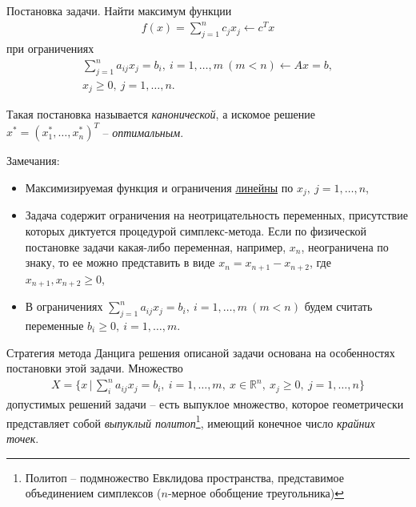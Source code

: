 \documentclass[%
	11pt,
	a4paper,
	utf8,
		]{article}
\begin{document}

Постановка задачи. Найти максимум функции
\begin{align*}
f(x) = \sum_{j=1}^{n} c_j x_j \leftarrow c^T x
\end{align*}
при ограничениях
\begin{align*}
	\sum_{j=1}^{n} a_{ij} x_j = b_i, \ i = 1, \ldots, m\  (m < n) \leftarrow Ax = b,\\
	x_j \geqslant 0, \ j = 1, \ldots, n.
\end{align*}

Такая постановка называется \emph{канонической}, а искомое решение $ x^{*} = (x_1^{*}, \ldots, x_n^{*})^T $ -- \emph{оптимальным}.

Замечания:
\begin{itemize}
	\item Максимизируемая функция и ограничения \underline{линейны} по $ x_j, \ j = 1, \ldots, n $,
	
	\item Задача содержит ограничения на неотрицательность переменных, присутствие которых диктуется процедурой симплекс-метода. Если по физической постановке задачи какая-либо переменная, например, $ x_n $, неограничена по знаку, то ее можно представить в виде $ x_n = x_{n+1} - x_{n+2} $, где $ x_{n+1}, x_{n+2} \geqslant 0 $,
	
	\item В ограничениях $ \sum\limits_{j=1}^{n} a_{ij} x_j = b_i, \ i = 1, \ldots, m\  (m < n) $ будем считать переменные $ b_i \geqslant 0, \ i = 1, \ldots, m $.
\end{itemize}

Стратегия метода Данцига решения описаной задачи основана на особенностях постановки этой задачи. Множество
\begin{align*}
	X = \{ x \, | \, \sum_{i}^{n} a_{ij} x_j = b_i, \ i = 1, \ldots, m, \ x \in \mathbb{R}^n, \ x_j \geqslant 0, \ j = 1, \ldots, n \}
\end{align*}
допустимых решений задачи -- есть выпуклое множество, которое геометрически представляет собой \emph{выпуклый политоп}\footnote{Политоп -- подмножество Евклидова пространства, представимое объединением симплексов ($ n $-мерное обобщение треугольника)}, имеющий конечное число \emph{крайних точек}.
\end{document}
